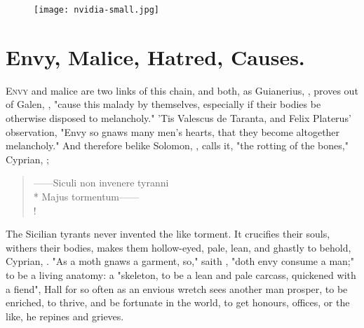 \cleartoleftpage{}
\begin{figure}[p]
  \begingroup
  \centering
  \texttt{[image: nvidia-small.jpg]}
  \label{fig:invidia}
\end{figure}

\clearpage{}
\thispagestyle{titleontop}

\section{Envy, Malice, Hatred, Causes.}

\lettrine{E}{nvy} and malice are two links of this chain, and both, as
Guianerius, , proves out of Galen,
, "cause this
malady by themselves, especially if their bodies be otherwise disposed to
melancholy." 'Tis Valescus de Taranta, and Felix Platerus' observation,
"Envy so gnaws many men's hearts, that they become
altogether melancholy." And therefore belike Solomon, , calls it, "the rotting of the bones," Cyprian, ;

\begin{latin}
\begin{verse}%
------Siculi non invenere tyranni\\*
Majus tormentum------\\!
\end{verse}%
\end{latin}

The Sicilian tyrants never invented the like torment. It crucifies their souls,
withers their bodies, makes them hollow-eyed, pale, lean,
and ghastly to behold, Cyprian, . "As a moth gnaws a garment, so," saith
\Chrysostom{}, "doth envy consume a man;" to be a living anatomy: a "skeleton, to
be a lean and pale carcass, quickened with a
fiend", Hall  for so
often as an envious wretch sees another man prosper, to be enriched, to thrive,
and be fortunate in the world, to get honours, offices, or the like, he repines
and grieves.


